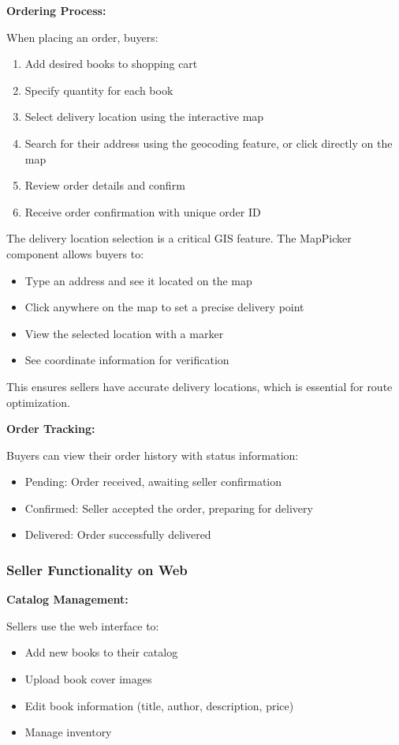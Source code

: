 \documentclass[12pt,a4paper]{article}
\begin{document}
\textbf{Ordering Process:}

When placing an order, buyers:
\begin{enumerate}
    \item Add desired books to shopping cart
    \item Specify quantity for each book
    \item Select delivery location using the interactive map
    \item Search for their address using the geocoding feature, or click directly on the map
    \item Review order details and confirm
    \item Receive order confirmation with unique order ID
\end{enumerate}

The delivery location selection is a critical GIS feature. The MapPicker component allows buyers to:
\begin{itemize}
    \item Type an address and see it located on the map
    \item Click anywhere on the map to set a precise delivery point
    \item View the selected location with a marker
    \item See coordinate information for verification
\end{itemize}

This ensures sellers have accurate delivery locations, which is essential for route optimization.

\textbf{Order Tracking:}

Buyers can view their order history with status information:
\begin{itemize}
    \item Pending: Order received, awaiting seller confirmation
    \item Confirmed: Seller accepted the order, preparing for delivery
    \item Delivered: Order successfully delivered
\end{itemize}

\subsubsection{Seller Functionality on Web}

\textbf{Catalog Management:}

Sellers use the web interface to:
\begin{itemize}
    \item Add new books to their catalog
    \item Upload book cover images
    \item Edit book information (title, author, description, price)
    \item Manage inventory
\end{itemize}
\end{document}
